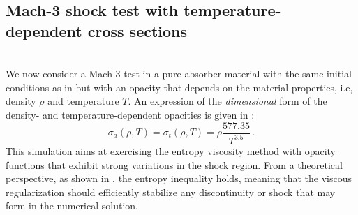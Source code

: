 \documentclass[times,doublespace]{fldauth}%
\begin{document}
\subsection{Mach-3 shock test with temperature-dependent cross sections}\label{sec:mach-3-no-cst-xs}
%
   \\
We now consider a Mach 3 test in a pure absorber material with the same initial conditions as in  but with an opacity that depends on the material properties, i.e, density $\rho$ and temperature $T$. An expression of the \emph{dimensional} form of the density- and  temperature-dependent opacities is given in :
%
\begin{equation}\label{eq:opacity}
\sigma_a(\rho,T) = \sigma_t(\rho,T) = \rho \frac{577.35}{T^{3.5}}\, .
\end{equation}
%
This simulation aims at exercising the entropy viscosity method with opacity functions that exhibit strong variations in the shock region. From a theoretical perspective, as shown in , the entropy inequality holds, meaning that the viscous regularization should efficiently stabilize any discontinuity or shock that may form in the numerical solution. 
\end{document}
